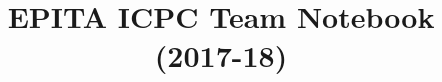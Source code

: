 \documentclass[10pt]{article}
\title{\vspace{-4ex}\Large{EPITA ICPC Team Notebook (2017-18)}}
\author{}
\date{}
\begin{document}
\begin{landscape}
\begin{multicols}{2}

\maketitle
\vspace{-13ex}
\tableofcontents
\pagestyle{fancy}



\end{multicols}
\end{landscape}
\end{document}
